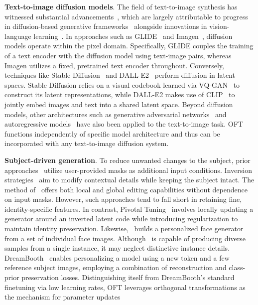 \textbf{Text-to-image diffusion models}. The field of text-to-image synthesis has witnessed substantial advancements~\cite{saharia2022photorealistic,ramesh2022hierarchical,rombach2022high,gu2022vector,nichol2022glide}, which are largely attributable to progress in diffusion-based generative frameworks~\cite{ho2020denoising,song2021score,song2021denoising,dhariwal2021diffusion} alongside innovations in vision-language learning~\cite{su2020vlbert,lu2019vilbert,radford2021learning,wang2021simvlm,li2022blip,li2023blip,alayrac2022flamingo,schuhmann2022laion}. In approaches such as GLIDE~\cite{nichol2022glide} and Imagen~\cite{saharia2022photorealistic}, diffusion models operate within the pixel domain. Specifically, GLIDE couples the training of a text encoder with the diffusion model using text-image pairs, whereas Imagen utilizes a fixed, pretrained text encoder throughout. Conversely, techniques like Stable Diffusion~\cite{rombach2022high} and DALL-E2~\cite{ramesh2022hierarchical} perform diffusion in latent spaces. Stable Diffusion relies on a visual codebook learned via VQ-GAN~\cite{esser2021taming} to construct its latent representations, while DALL-E2 makes use of CLIP~\cite{radford2021learning} to jointly embed images and text into a shared latent space. Beyond diffusion models, other architectures such as generative adversarial networks~\cite{reed2016generative,zhang2017stackgan,xu2018attngan,li2019controllable} and autoregressive models~\cite{ramesh2021zero,ding2021cogview,wu2022nuwa,yuscaling} have also been applied to the text-to-image task. OFT functions independently of specific model architecture and thus can be incorporated with any text-to-image diffusion system.

\textbf{Subject-driven generation}. To reduce unwanted changes to the subject, prior approaches~\cite{avrahami2022blended,nichol2022glide} utilize user-provided masks as additional input conditions. Inversion strategies~\cite{choi2021ilvr,dhariwal2021diffusion,ramesh2022hierarchical,gal2022image} aim to modify contextual details while keeping the subject intact. The method of~\cite{hertz2022prompt} offers both local and global editing capabilities without dependence on input masks. However, such approaches tend to fall short in retaining fine, identity-specific features. In contrast, Pivotal Tuning~\cite{roich2022pivotal} involves locally updating a generator around an inverted latent code while introducing regularization to maintain identity preservation. Likewise,~\cite{nitzan2022mystyle} builds a personalized face generator from a set of individual face images. Although~\cite{casanova2021instance} is capable of producing diverse samples from a single instance, it may neglect distinctive instance details. DreamBooth~\cite{ruiz2023dreambooth} enables personalizing a model using a new token and a few reference subject images, employing a combination of reconstruction and class-prior preservation losses. Distinguishing itself from DreamBooth's standard finetuning via low learning rates, OFT leverages orthogonal transformations as the mechanism for parameter updates

